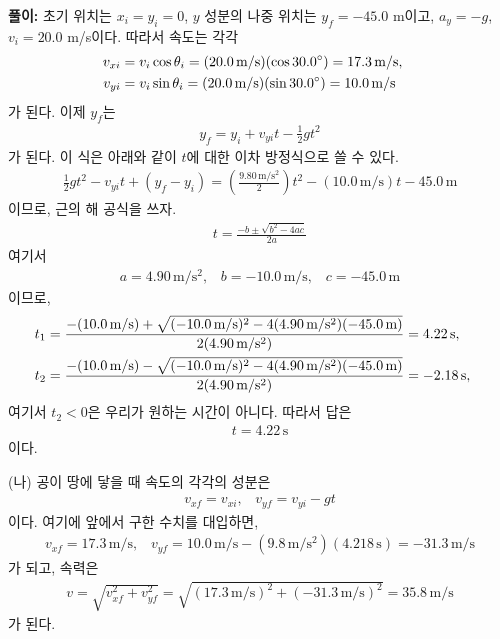 \documentclass[floatfix,nofootinbib,superscriptaddress,fleqn,preprint]{revtex4-2}
\begin{document}
\noindent \textbf{풀이:}
초기 위치는 $x_i=y_i=0$, $y$ 성분의 나중
위치는 $y_f=-45.0$ m이고, $a_y=-g$, $v_i=20.0$ m/s이다. 따라서 속도는
각각
\begin{align}
v_{xi}  &=v_i\cos\theta_i =(20.0\,\mathrm{m/s})(\cos30.0^\circ) = 17.3
          \,\mathrm{m/s},\cr
v_{yi} &= v_i\sin\theta_i = (20.0\,\mathrm{m/s})(\sin30.0^\circ) =
         10.0    \,\mathrm{m/s}           
\end{align}
가 된다. 이제 $y_f$는
\begin{align}
  \label{eq:5}
 y_f = y_i + v_{yi} t - \frac12 g t^2 
\end{align}
가 된다. 이 식은 아래와 같이 $t$에 대한 이차 방정식으로 쓸 수 있다.
\begin{align}
  \label{eq:6}
  \frac12 g t^2 -v_{yi}t +(y_f-y_i) =
  \left(\frac{9.80\,\mathrm{m/s^2}}{2}\right) t^2 -
  (10.0\,\mathrm{m/s})   t -45.0\,\mathrm{m} 
\end{align}
이므로, 근의 해 공식을 쓰자.
\begin{align}
t = \frac{-b\pm\sqrt{b^2 - 4ac}}{2a}  
\end{align}
여기서
\begin{align}
  \label{eq:8}
  a = 4.90\,\mathrm{m/s^2},\;\;\; b = -10.0\,\mathrm{m/s} ,\;\;\;
  c= -45.0\,\mathrm{m}
\end{align}
이므로,
\begin{align}
  \label{eq:9}
  t_1 &= \frac{-(10.0\,\mathrm{m/s})+\sqrt{(-10.0\,\mathrm{m/s})^2
  -  4(4.90\,\mathrm{m/s^2})(-45.0\,\mathrm{m})}}
        {2(4.90\,\mathrm{m/s^2})}  = 4.22\,\mathrm{s}, \cr
 t_2 &= \frac{-(10.0\,\mathrm{m/s})-\sqrt{(-10.0\,\mathrm{m/s})^2
  -  4(4.90\,\mathrm{m/s^2})(-45.0\,\mathrm{m})}}
        {2(4.90\,\mathrm{m/s^2})}  = -2.18\,\mathrm{s},        
\end{align}
여기서 $t_2<0$은 우리가 원하는 시간이 아니다. 따라서 답은 
\begin{align}
t = 4.22\,\mathrm{s}  
\end{align}
이다.

\noindent (나) 공이 땅에 닿을 때 속도의 각각의 성분은 
\begin{align}
  \label{eq:11}
  v_{xf} = v_{xi} ,\;\;\;
  v_{yf} = v_{yi} -gt 
\end{align}
이다. 여기에 앞에서 구한 수치를 대입하면,
\begin{align}
  v_{xf} =17.3\,\mathrm{m/s},\;\;\;
  v_{yf} = 10.0\,\mathrm{m/s} -
  (9.8\,\mathrm{m/s^2})(4.218\,\mathrm{s}) = -31.3\,\mathrm{m/s} 
\end{align}
가 되고, 속력은
\begin{align}
  \label{eq:13}
v = \sqrt{v_{xf}^2 +v_{yf}^2} = \sqrt{(17.3\,\mathrm{m/s})^2
  +(-31.3\,\mathrm{m/s})^2} =35.8\,\mathrm{m/s}  
\end{align}
가 된다.
\end{document}
